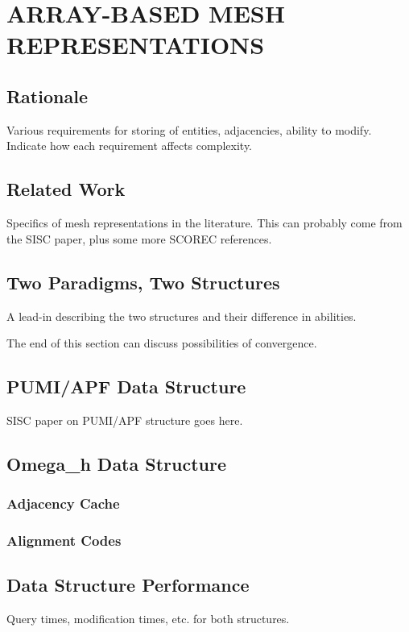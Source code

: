 
\chapter{ARRAY-BASED MESH REPRESENTATIONS}
\label{chap:struct}

\section{Rationale}

Various requirements for storing of entities, adjacencies,
ability to modify.
Indicate how each requirement affects complexity.

\section{Related Work}

Specifics of mesh representations in the literature.
This can probably come from the SISC paper, plus
some more SCOREC references.

\section{Two Paradigms, Two Structures}

A lead-in describing the two structures and their difference
in abilities.

The end of this section can discuss possibilities of convergence.

\section{PUMI/APF Data Structure}

SISC paper on PUMI/APF structure goes here.

\section{Omega\_h Data Structure}

\subsection{Adjacency Cache}

\subsection{Alignment Codes}

\section{Data Structure Performance}

Query times, modification times, etc. for both structures.

